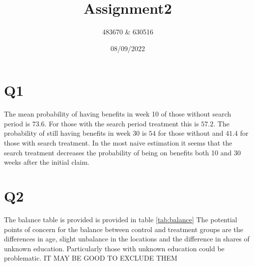 \documentclass[
]{article}
\title{Assignment2}
\author{483670 \& 630516}
\date{08/09/2022}
\newenvironment{Shaded}{\begin{snugshade}}{\end{snugshade}}
\newcommand{\DecValTok}[1]{\textcolor[rgb]{0.00,0.00,0.81}{#1}}
\newcommand{\FunctionTok}[1]{\textcolor[rgb]{0.00,0.00,0.00}{#1}}
\newcommand{\NormalTok}[1]{#1}
\newcommand{\OtherTok}[1]{\textcolor[rgb]{0.56,0.35,0.01}{#1}}
\newcommand{\SpecialCharTok}[1]{\textcolor[rgb]{0.00,0.00,0.00}{#1}}
\begin{document}
\maketitle

\hypertarget{q1}{%
\section{Q1}\label{q1}}

The mean probability of having benefits in week 10 of those without
search period is \(73.6%
\). For those with the search period treatment this is \(57.2%
\). The probability of still having benefits in week 30 is \(54%
\) for those without and \(41.4%
\) for those with search treatment. In the most naive estimation it
seems that the search treatment decreases the probability of being on
benefits both 10 and 30 weeks after the initial claim.

\begin{Shaded}
\end{Shaded}

\hypertarget{q2}{%
\section{Q2}\label{q2}}

The balance table is provided is provided in table \ref{tab:balance} The
potential points of concern for the balance between control and
treatment groups are the differences in age, slight unbalance in the
locations and the difference in shares of unknown education.
Particularly those with unknown education could be problematic. IT MAY
BE GOOD TO EXCLUDE THEM
\end{document}
